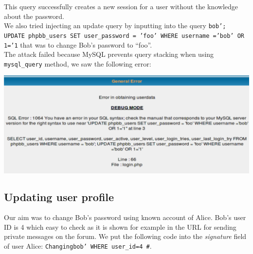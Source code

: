\documentclass[12pt, a4paper]{article}
\begin{document}
This query successfully creates a new session for a user without the knowledge about the password.\\

We also tried injecting an update query by inputting into the query
\texttt{bob'; UPDATE phpbb\_users SET user\_password = 'foo' WHERE username ='bob' OR 1='1} 
that was to change Bob's password to ``foo''.\\
The attack failed because MySQL prevents query stacking when using \texttt{mysql\_query} method, we saw the following error:

\includegraphics[width=.95\textwidth]{gfx/sql/updateerr.png}

\subsection{Updating user profile}

Our aim was to change Bob's password using known account of Alice. Bob's user ID is 4 which easy to check as it is shown for example in the URL for sending private messages on the forum. We put the following code into the \emph{signature} field of user Alice: \texttt{Changingbob' WHERE user\_id=4 \#}.\\
\end{document}
